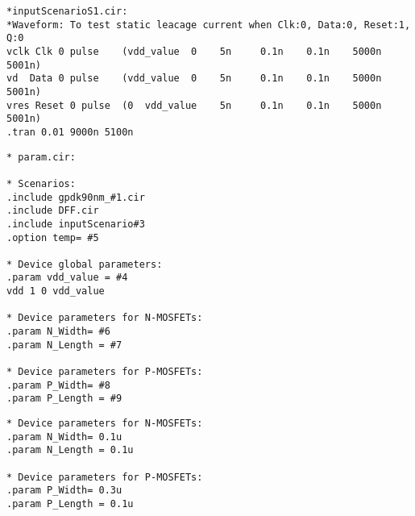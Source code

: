 \begin{lstlisting}
*inputScenarioS1.cir:
*Waveform: To test static leacage current when Clk:0, Data:0, Reset:1, Q:0
vclk Clk 0 pulse    (vdd_value  0    5n     0.1n    0.1n    5000n     5001n)     
vd  Data 0 pulse    (vdd_value  0    5n     0.1n    0.1n    5000n     5001n)   
vres Reset 0 pulse  (0  vdd_value    5n     0.1n    0.1n    5000n     5001n)   
.tran 0.01 9000n 5100n
\end{lstlisting}

\begin{lstlisting}
* param.cir:

* Scenarios:
.include gpdk90nm_#1.cir 
.include DFF.cir
.include inputScenario#3
.option temp= #5

* Device global parameters:
.param vdd_value = #4
vdd 1 0 vdd_value

* Device parameters for N-MOSFETs:
.param N_Width= #6
.param N_Length = #7

* Device parameters for P-MOSFETs:
.param P_Width= #8
.param P_Length = #9
\end{lstlisting}



\begin{lstlisting}
* Device parameters for N-MOSFETs:
.param N_Width= 0.1u
.param N_Length = 0.1u

* Device parameters for P-MOSFETs:
.param P_Width= 0.3u
.param P_Length = 0.1u
\end{lstlisting}